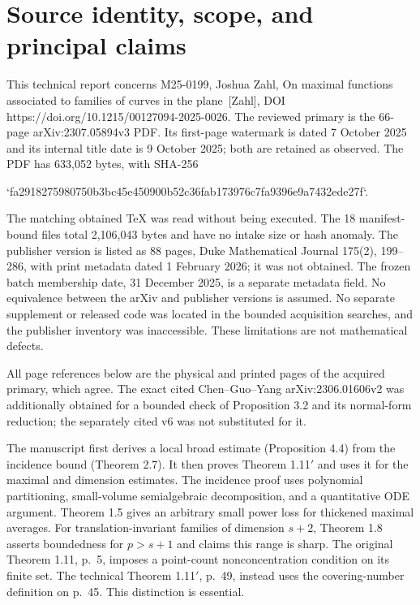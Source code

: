 \documentclass[10pt]{article}
\begin{document}
\section*{Source identity, scope, and principal claims}
This technical report concerns M25-0199, Joshua Zahl, On maximal functions associated to families of curves in the plane [Zahl], DOI https://doi.org/10.1215/00127094-2025-0026. The reviewed primary is the 66-page arXiv:2307.05894v3 PDF. Its first-page watermark is dated 7 October 2025 and its internal title date is 9 October 2025; both are retained as observed. The PDF has 633,052 bytes, with SHA-256\par
`fa2918275980750b3bc45e450900b52c36fab173976c7fa9396e9a7432ede27f`.\par
The matching obtained TeX was read without being executed. The 18 manifest-bound files total 2,106,043 bytes and have no intake size or hash anomaly. The publisher version is listed as 88 pages, Duke Mathematical Journal 175(2), 199–286, with print metadata dated 1 February 2026; it was not obtained. The frozen batch membership date, 31 December 2025, is a separate metadata field. No equivalence between the arXiv and publisher versions is assumed. No separate supplement or released code was located in the bounded acquisition searches, and the publisher inventory was inaccessible. These limitations are not mathematical defects.\par
All page references below are the physical and printed pages of the acquired primary, which agree. The exact cited Chen–Guo–Yang arXiv:2306.01606v2 was additionally obtained for a bounded check of Proposition 3.2 and its normal-form reduction; the separately cited v6 was not substituted for it.\par
The manuscript first derives a local broad estimate (Proposition 4.4) from the incidence bound (Theorem 2.7). It then proves Theorem 1.11\('\) and uses it for the maximal and dimension estimates. The incidence proof uses polynomial partitioning, small-volume semialgebraic decomposition, and a quantitative ODE argument. Theorem 1.5 gives an arbitrary small power loss for thickened maximal averages. For translation-invariant families of dimension \(s+2\), Theorem 1.8 asserts boundedness for \(p>s+1\) and claims this range is sharp. The original Theorem 1.11, p. 5, imposes a point-count nonconcentration condition on its finite set. The technical Theorem 1.11\('\), p. 49, instead uses the covering-number definition on p. 45. This distinction is essential.\par
\end{document}
